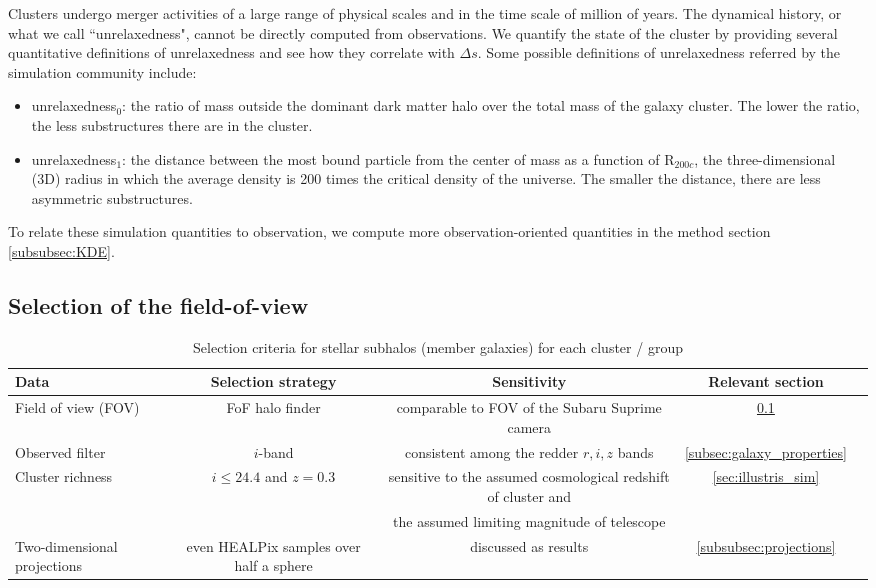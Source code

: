 Clusters undergo merger activities of a large range of physical scales and 
in the time scale of million of years. 
The dynamical history, or what we call ``unrelaxedness", cannot be directly 
computed from observations.
We quantify the state of the cluster by providing several quantitative
definitions of unrelaxedness and see how they correlate with $\Delta s$.
Some possible definitions of unrelaxedness referred by the simulation community
include:
\begin{itemize}
	\item unrelaxedness$_0$: the ratio of mass outside the dominant dark matter halo over the total mass
		of the galaxy cluster. The lower the ratio, the less substructures there
		are in the cluster. 
	\item unrelaxedness$_1$: the distance between the most bound particle from the center of mass as a
		function of R$_{200c}$, the three-dimensional (3D) radius in which the
		average density is 200 times the critical density of the universe. 
		The smaller the distance, there are less asymmetric 
		substructures. 
\end{itemize}
To relate these simulation quantities to observation, 
we compute more observation-oriented 
quantities in the method section \ref{subsubsec:KDE}. 

\subsection{Selection of the field-of-view}
\label{sec:FOV}

\begin{table*}
\begin{center}
\begin{minipage}{180mm} 
	\caption{ Selection criteria for stellar subhalos (member galaxies) for each
		cluster / group 
\label{tab:member_galaxy_selections}} 
	\begin{tabular}{@{}lcccc@{}}
\hline 
Data &  Selection strategy  & Sensitivity & Relevant section  \\ \hline
Field of view (FOV) & FoF halo finder& comparable to FOV of the Subaru
Suprime camera & \ref{sec:FOV}  \\ 
Observed filter & $i$-band & consistent among the redder $r, i, z$ bands &   
\ref{subsec:galaxy_properties}
\\ 
Cluster richness  & $i \leq 24.4$ and $z = 0.3$  & sensitive to
the assumed cosmological redshift of cluster and & \ref{sec:illustris_sim} \\ 
& & the assumed limiting magnitude of telescope &   \\
Two-dimensional projections & even HEALPix samples over half a sphere &
discussed as results  & \ref{subsubsec:projections}\\  
\hline
\end{tabular} 
\footnotesize{
}
\end{minipage}
\end{center} 
\end{table*}

